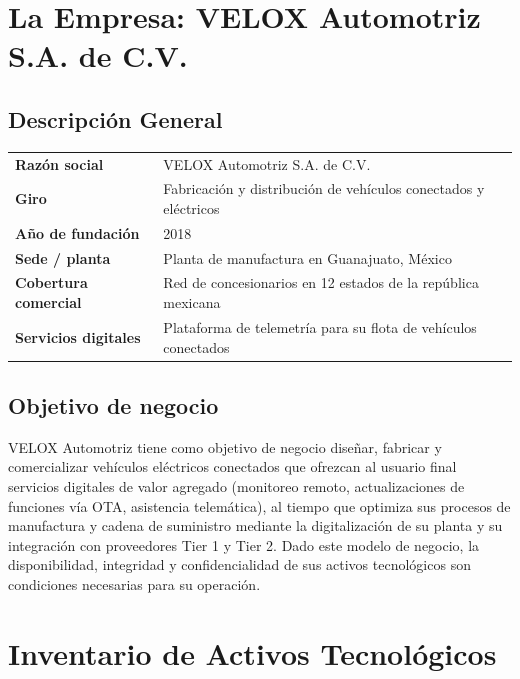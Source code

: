 \documentclass[letterpaper,11pt]{article}
\begin{document}
\section{La Empresa: VELOX Automotriz S.A. de C.V.}

\subsection{Descripción General}


\begin{center}
\begin{tabular}{>{\bfseries}p{4.0cm} p{9.7cm}}
\toprule
Razón social & VELOX Automotriz S.A. de C.V. \\
Giro & Fabricación y distribución de vehículos conectados y eléctricos \\
Año de fundación & 2018 \\
Sede / planta & Planta de manufactura en Guanajuato, México \\
Cobertura comercial & Red de concesionarios en 12 estados de la república mexicana \\
Servicios digitales & Plataforma de telemetría para su flota de vehículos conectados \\
\bottomrule
\end{tabular}
\end{center}


\subsection{Objetivo de negocio}
 
VELOX Automotriz tiene como objetivo de negocio diseñar, fabricar y comercializar vehículos eléctricos conectados que ofrezcan al usuario final servicios digitales de valor agregado (monitoreo remoto, actualizaciones de funciones vía OTA, asistencia telemática), al tiempo que optimiza sus procesos de manufactura y cadena de suministro mediante la digitalización de su planta y su integración con proveedores Tier 1 y Tier 2. Dado este modelo de negocio, la disponibilidad, integridad y confidencialidad de sus activos tecnológicos son condiciones necesarias para su operación.

\section{Inventario de Activos Tecnológicos}
\end{document}

